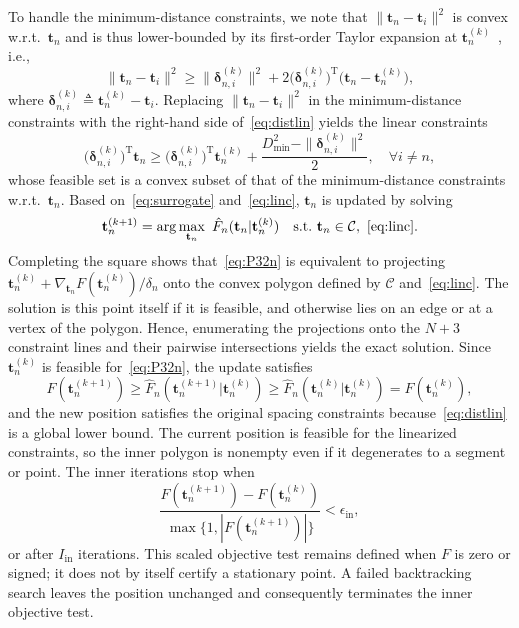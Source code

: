 \documentclass[journal]{IEEEtran}
\newcommand{\bt}{\mathbf{t}}
\newcommand{\bDel}{\boldsymbol{\delta}}
\newcommand{\Dmin}{D_{\mathrm{min}}}
\begin{document}
To handle the minimum-distance constraints, we note that $\|\bt_n-\bt_i\|^2$ is convex w.r.t.\ $\bt_n$ and is thus lower-bounded by its first-order Taylor expansion at $\bt_n^{(k)}$~\cite{ZhengTCOM2025}, i.e.,
\begin{equation}\label{eq:distlin}
\|\bt_n-\bt_i\|^2\ge\|\bDel_{n,i}^{(k)}\|^2+2\big(\bDel_{n,i}^{(k)}\big)^{\mathrm{T}}\big(\bt_n-\bt_n^{(k)}\big),
\end{equation}
where $\bDel_{n,i}^{(k)}\triangleq\bt_n^{(k)}-\bt_i$. Replacing $\|\bt_n-\bt_i\|^2$ in the minimum-distance constraints with the right-hand side of~\eqref{eq:distlin} yields the linear constraints
\begin{equation}\label{eq:linc}
\big(\bDel_{n,i}^{(k)}\big)^{\mathrm{T}}\bt_n\ge\big(\bDel_{n,i}^{(k)}\big)^{\mathrm{T}}\bt_n^{(k)}+\frac{\Dmin^2-\|\bDel_{n,i}^{(k)}\|^2}{2},\quad\forall i\neq n,
\end{equation}
whose feasible set is a convex subset of that of the minimum-distance constraints w.r.t.\ $\bt_n$. Based on~\eqref{eq:surrogate} and~\eqref{eq:linc}, $\bt_n$ is updated by solving
\begin{equation}\label{eq:P32n}
\bt_n^{(k+1)}=\arg\max_{\bt_n}\ \hat F_n(\bt_n|\bt_n^{(k)})\quad\mathrm{s.t.}\ \bt_n\in\mathcal C,\ \eqref{eq:linc}.
\end{equation}
Completing the square shows that~\eqref{eq:P32n} is equivalent to projecting $\bt_n^{(k)}+\nabla_{\bt_n}F(\bt_n^{(k)})/\delta_n$ onto the convex polygon defined by $\mathcal C$ and~\eqref{eq:linc}. The solution is this point itself if it is feasible, and otherwise lies on an edge or at a vertex of the polygon. Hence, enumerating the projections onto the $N+3$ constraint lines and their pairwise intersections yields the exact solution. Since $\bt_n^{(k)}$ is feasible for~\eqref{eq:P32n}, the update satisfies
\begin{equation}\label{eq:mono}
F(\bt_n^{(k+1)})\ge\hat F_n(\bt_n^{(k+1)}|\bt_n^{(k)})\ge\hat F_n(\bt_n^{(k)}|\bt_n^{(k)})=F(\bt_n^{(k)}),
\end{equation}
and the new position satisfies the original spacing constraints because~\eqref{eq:distlin} is a global lower bound. The current position is feasible for the linearized constraints, so the inner polygon is nonempty even if it degenerates to a segment or point. The inner iterations stop when
\begin{equation*}
\frac{F(\bt_n^{(k+1)})-F(\bt_n^{(k)})}
{\max\{1,|F(\bt_n^{(k+1)})|\}}
<\epsilon_{\mathrm{in}},
\end{equation*}
or after $I_{\mathrm{in}}$ iterations. This scaled objective test remains defined when $F$ is zero or signed; it does not by itself certify a stationary point. A failed backtracking search leaves the position unchanged and consequently terminates the inner objective test.
\end{document}
